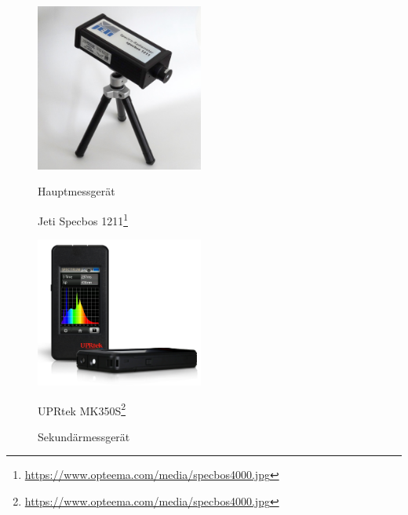 \begin{figure}
\begin{minipage}[hbt]{0.49\textwidth}
	\centering
	\includegraphics[width=0.49\textwidth]{bilder/jeti}
	\label{b_jeti}
	\setcounter{mpfootnote}{\value{footnote}}
      \renewcommand{\thempfootnote}{\arabic{mpfootnote}}
       \caption{Hauptmessgerät}
      Jeti Specbos 1211\footnote{\url{https://www.opteema.com/media/specbos4000.jpg}}
        \setcounter{footnote}{\value{mpfootnote}}
\end{minipage}
\hfill
\begin{minipage}[hbt]{0.49\textwidth}
	\centering
	\includegraphics[width=0.49\textwidth]{bilder/mk350s}
	\label{b_mk350s}
	\setcounter{mpfootnote}{\value{footnote}}
      \renewcommand{\thempfootnote}{\arabic{mpfootnote}}
      \caption{Sekundärmessgerät}
      UPRtek MK350S\footnote{\url{https://www.opteema.com/media/specbos4000.jpg}}
            \setcounter{footnote}{\value{mpfootnote}}
\end{minipage}
\end{figure}





